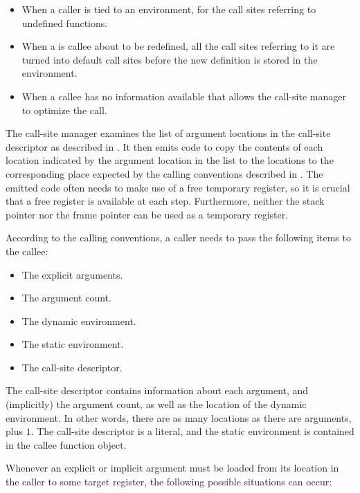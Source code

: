 \begin{itemize}
\item When a caller is tied to an environment, for the call sites
  referring to undefined functions.
\item When a is callee about to be redefined, all the call sites
  referring to it are turned into default call sites before the new
  definition is stored in the environment.
\item When a callee has no information available that allows the
  call-site manager to optimize the call.
\end{itemize}

The call-site manager examines the list of argument locations in the
call-site descriptor as described in
.  It then emits code to copy the
contents of each location indicated by the argument location in the
list to the locations to the corresponding place expected by the
calling conventions described in .
The emitted code often needs to make use of a free temporary register,
so it is crucial that a free register is available at each step.
Furthermore, neither the stack pointer nor the frame pointer can
be used as a temporary register.

According to the calling conventions, a caller needs to pass the
following items to the callee:

\begin{itemize}
\item The explicit arguments.
\item The argument count.
\item The dynamic environment.
\item The static environment.
\item The call-site descriptor.
\end{itemize}

The call-site descriptor contains information about each argument, and
(implicitly) the argument count, as well as the location of the
dynamic environment.  In other words, there are as many locations as
there are arguments, plus $1$. The call-site descriptor is a literal,
and the static environment is contained in the callee function object.

Whenever an explicit or implicit argument must be loaded from its
location in the caller to some target register, the following possible
situations can occur:

